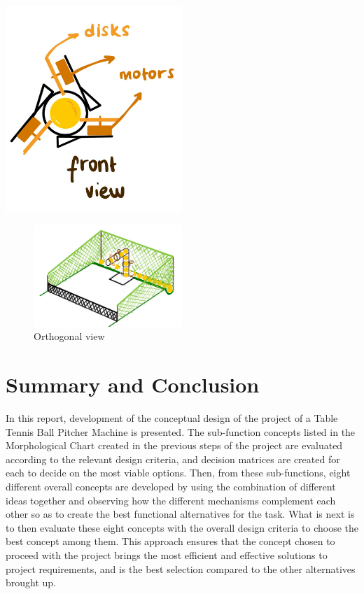 \documentclass[12pt]{article}
\begin{document}
\begin{minipage}[t]{0.25\textwidth}
    \includegraphics[width=0.5\textwidth]{best_concept/front.jpeg}
\end{minipage}


\begin{figure}[H]
    \centering
    \includegraphics[width=0.5\textwidth]{best_concept/whole.jpeg}
    \caption{Orthogonal view}
    \label{fig:whole_best}
\end{figure}


\section{Summary and Conclusion}

In this report, development of the conceptual design of the project of a Table Tennis Ball Pitcher Machine is presented. The sub-function concepts listed in the Morphological Chart created in the previous steps of the project are evaluated according to the relevant design criteria, and decision matrices are created for each to decide on the most viable options. Then, from these sub-functions, eight different overall concepts are developed by using the combination of different ideas together and observing how the different mechanisms complement each other so as to create the best functional alternatives for the task. What is next is to then evaluate these eight concepts with the overall design criteria to choose the best concept among them. This approach ensures that the concept chosen to proceed with the project brings the most efficient and effective solutions to project requirements, and is the best selection compared to the other alternatives brought up.
\end{document}
